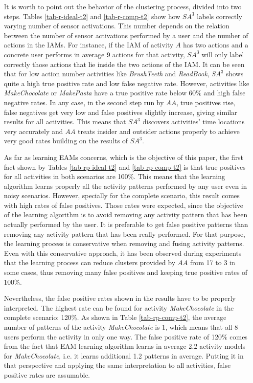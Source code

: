 It is worth to point out the behavior of the clustering process, divided into two steps. Tables \ref{tab-r-ideal-t2} and \ref{tab-r-comp-t2} show how $SA^3$ labels correctly varying number of sensor activations. This number depends on the relation between the number of sensor activations performed by a user and the number of actions in the IAMs. For instance, if the IAM of activity $A$ has two actions and a concrete user performs in average 9 actions for that activity, $SA^3$ will only label correctly those actions that lie inside the two actions of the IAM. It can be seen that for low action number activities like \textit{BrushTeeth} and \textit{ReadBook}, $SA^3$ shows quite a high true positive rate and low false negative rate. However, activities like \textit{MakeChocolate} or \textit{MakePasta} have a true positive rate below 60\% and high false negative rates. In any case, in the second step run by $AA$, true positives rise, false negatives get very low and false positives slightly increase, giving similar results for all activities. This means that $SA^3$ discovers activities' time locations very accurately and $AA$ treats insider and outsider actions properly to achieve very good rates building on the results of $SA^3$.

As far as learning EAMs concerns, which is the objective of this paper, the first fact shown by Tables \ref{tab-rp-ideal-t2} and \ref{tab-rp-comp-t2} is that true positives for all activities in both scenarios are 100\%. This means that the learning algorithm learns properly all the activity patterns performed by any user even in noisy scenarios. However, specially for the complete scenario, this result comes with high rates of false positives. Those rates were expected, since the objective of the learning algorithm is to avoid removing any activity pattern that has been actually performed by the user. It is preferable to get false positive patterns than removing any activity pattern that has been really performed. For that purpose, the learning process is conservative when removing and fusing activity patterns. Even with this conservative approach, it has been observed during experiments that the learning process can reduce clusters provided by $AA$ from 17 to 3 in some cases, thus removing many false positives and keeping true positive rates of 100\%. 

Nevertheless, the false positive rates shown in the results have to be properly interpreted. The highest rate can be found for activity \textit{MakeChocolate} in the complete scenario: 120\%. As shown in Table \ref{tab-rp-comp-t2}, the average number of patterns of the activity \textit{MakeChocolate} is 1, which means that all 8 users perform the activity in only one way. The false positive rate of 120\% comes from the fact that EAM learning algorithm learns in average 2.2 activity models for \textit{MakeChocolate}, i.e. it learns additional 1.2 patterns in average. Putting it in that perspective and applying the same interpretation to all activities, false positive rates are assumable.


